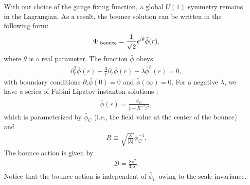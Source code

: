 \documentclass[12pt]{article}
\begin{document}
With our choice of the gauge fixing function, a global $U(1)$ symmetry
remains in the Lagrangian.  As a result, the bounce solution can be
written in the following form:
\begin{align}
  \Phi|_{\rm bounce} = \frac{1}{\sqrt{2}} e^{i\theta}
  \bar\phi(r),
\end{align}
where $\theta$ is a real parameter.  The function $\bar{\phi}$ obeys
\begin{align}
  \partial_r^2\bar\phi(r)
  +\frac{3}{r}\partial_r\bar\phi(r)
  -\lambda\bar\phi^3(r) = 0,
  \label{eq_Bounce}
\end{align}
with boundary conditions $\partial_r\bar\phi(0) = 0$ and
$\bar\phi(\infty) = 0$.  For a negative $\lambda$, we have a series of
Fubini-Lipatov instanton solutions \cite{Fubini:1976jm,Lipatov:1976ny}:
\begin{align}
  \bar\phi(r) = \frac{\bar\phi_C}{1+R^{-2} r^2},
  \label{BounceSolution}
\end{align}
which is parameterized by $\bar\phi_C$ (i.e., the field value at the
center of the bounce) and
\begin{align}
  R \equiv \sqrt{\frac{8}{|\lambda|}} \phi_C^{-1}.
\end{align}
The bounce action is given by
\begin{align}
 \mathcal B = \frac{8\pi^2}{3|\lambda|}.
\end{align}
Notice that the bounce action is independent of $\bar\phi_C$ owing to
the scale invariance.
\end{document}
